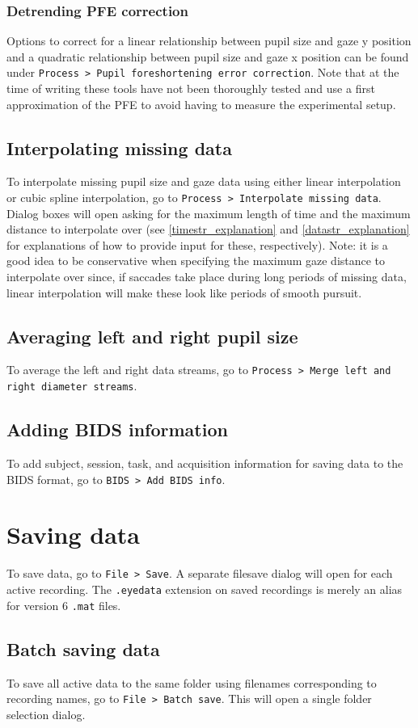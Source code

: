 \documentclass{article}
\begin{document}
\subsubsection{Detrending PFE correction}
Options to correct for a linear relationship between pupil size and gaze y position and a quadratic relationship between pupil size and gaze x position can be found under \texttt{Process > Pupil foreshortening error correction}. Note that at the time of writing these tools have not been thoroughly tested and use a first approximation of the PFE to avoid having to measure the experimental setup.
\subsection{Interpolating missing data}
To interpolate missing pupil size and gaze data using either linear interpolation or cubic spline interpolation, go to \texttt{Process > Interpolate missing data}. Dialog boxes will open asking for the maximum length of time and the maximum distance to interpolate over (see \ref{timestr_explanation} and \ref{datastr_explanation} for explanations of how to provide input for these, respectively). Note: it is a good idea to be conservative when specifying the maximum gaze distance to interpolate over since, if saccades take place during long periods of missing data, linear interpolation will make these look like periods of smooth pursuit.
\subsection{Averaging left and right pupil size}
To average the left and right data streams, go to \texttt{Process > Merge left and right diameter streams}.
\subsection{Adding BIDS information}
To add subject, session, task, and acquisition information for saving data to the BIDS format, go to \texttt{BIDS > Add BIDS info}.
\section{Saving data}
To save data, go to \texttt{File > Save}. A separate filesave dialog will open for each active recording. The \texttt{.eyedata} extension on saved recordings is merely an alias for version 6 \texttt{.mat} files.
\subsection{Batch saving data}
To save all active data to the same folder using filenames corresponding to recording names, go to \texttt{File > Batch save}. This will open a single folder selection dialog.
\end{document}
